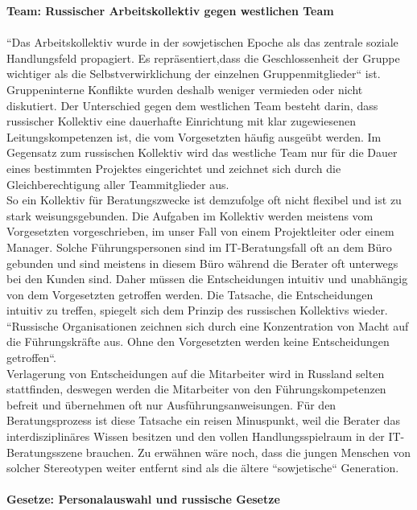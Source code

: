 	\textbf{Team: %
	Russischer Arbeitskollektiv gegen westlichen Team}\\
	\\
	``Das Arbeitskollektiv wurde in der sowjetischen 
	Epoche als das zentrale soziale Handlungsfeld propagiert. Es repräsentiert,dass die Geschlossenheit der Gruppe wichtiger als die Selbstverwirklichung der einzelnen Gruppenmitglieder`` ist.\cite{ProzessbeglBerRU}\\
	Gruppeninterne Konflikte wurden deshalb weniger vermieden oder nicht diskutiert. Der Unterschied gegen dem westlichen Team besteht darin, dass russischer Kollektiv eine dauerhafte Einrichtung mit klar zugewiesenen Leitungskompetenzen ist, die vom Vorgesetzten häufig ausgeübt werden. Im Gegensatz zum russischen Kollektiv wird das westliche Team nur für die Dauer eines bestimmten Projektes eingerichtet und zeichnet sich durch die Gleichberechtigung aller Teammitglieder aus.\\
	So ein Kollektiv für Beratungszwecke ist demzufolge oft nicht flexibel und ist zu stark weisungsgebunden. Die Aufgaben im Kollektiv werden meistens vom Vorgesetzten vorgeschrieben, im unser Fall von einem Projektleiter oder einem Manager. Solche Führungspersonen sind im IT-Beratungsfall oft an dem Büro gebunden und sind meistens in diesem Büro während die Berater oft unterwegs bei den Kunden sind. Daher müssen die Entscheidungen intuitiv und unabhängig von dem Vorgesetzten getroffen werden. Die Tatsache, die Entscheidungen intuitiv zu treffen, spiegelt sich dem Prinzip des russischen Kollektivs wieder.  ``Russische Organisationen zeichnen sich durch eine Konzentration von Macht auf die Führungskräfte aus. Ohne den Vorgesetzten werden keine Entscheidungen getroffen``. \cite{ProzessbeglBerRU} \\
	Verlagerung von Entscheidungen auf die Mitarbeiter wird in Russland selten stattfinden, deswegen werden die Mitarbeiter von den Führungskompetenzen befreit und übernehmen oft nur Ausführungsanweisungen. Für  den Beratungsprozess ist diese Tatsache ein reisen Minuspunkt, weil die Berater das interdisziplinäres Wissen besitzen und  den vollen Handlungsspielraum in der IT-Beratungsszene brauchen.
	Zu erwähnen wäre noch, dass die jungen Menschen von solcher Stereotypen weiter entfernt sind als die ältere ``sowjetische`` Generation. \\ \\
	\textbf{Gesetze: Personalauswahl und russische Gesetze}\\
	\\
